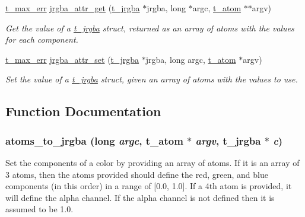 \begin{DoxyCompactItemize}
\hyperlink{group__datatypes_ga73edaae82b318855cc09fac994918165}{t\_\-max\_\-err} \hyperlink{group__color_ga27b52b9c7e3b8e9fafccdfcb4caee127}{jrgba\_\-attr\_\-get} (\hyperlink{structt__jrgba}{t\_\-jrgba} $\ast$jrgba, long $\ast$argc, \hyperlink{structt__atom}{t\_\-atom} $\ast$$\ast$argv)
\begin{DoxyCompactList}\small\item\em Get the value of a \hyperlink{structt__jrgba}{t\_\-jrgba} struct, returned as an array of atoms with the values for each component. \item\end{DoxyCompactList}\item 
\hyperlink{group__datatypes_ga73edaae82b318855cc09fac994918165}{t\_\-max\_\-err} \hyperlink{group__color_ga22c35beb59c7430d6c6e25e6e1fdb8c9}{jrgba\_\-attr\_\-set} (\hyperlink{structt__jrgba}{t\_\-jrgba} $\ast$jrgba, long argc, \hyperlink{structt__atom}{t\_\-atom} $\ast$argv)
\begin{DoxyCompactList}\small\item\em Set the value of a \hyperlink{structt__jrgba}{t\_\-jrgba} struct, given an array of atoms with the values to use. \item\end{DoxyCompactList}\end{DoxyCompactItemize}


\subsection{Function Documentation}
\hypertarget{group__color_ga78325ce33d8e74c79c4f1adeef3e36f7}{
\subsubsection[{atoms\_\-to\_\-jrgba}]{ atoms\_\-to\_\-jrgba (long {\em argc}, \/  {\bf t\_\-atom} $\ast$ {\em argv}, \/  {\bf t\_\-jrgba} $\ast$ {\em c})}}
\label{group__color_ga78325ce33d8e74c79c4f1adeef3e36f7}


Set the components of a color by providing an array of atoms. If it is an array of 3 atoms, then the atoms provided should define the red, green, and blue components (in this order) in a range of \mbox{[}0.0, 1.0\mbox{]}. If a 4th atom is provided, it will define the alpha channel. If the alpha channel is not defined then it is assumed to be 1.0.



